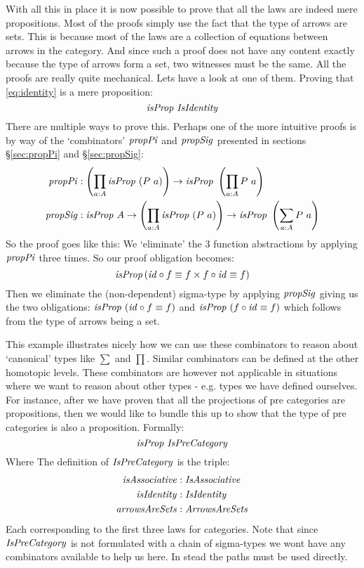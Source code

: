 With all this in place it is now possible to prove that all the laws are indeed
mere propositions. Most of the proofs simply use the fact that the type of
arrows are sets. This is because most of the laws are a collection of equations
between arrows in the category. And since such a proof does not have any content
exactly because the type of arrows form a set, two witnesses must be the same.
All the proofs are really quite mechanical. Lets have a look at one of them.
Proving that \ref{eq:identity} is a mere proposition:
%
\begin{equation}
  \isProp\ \var{IsIdentity}
\end{equation}
%
There are multiple ways to prove this. Perhaps one of the more intuitive proofs
is by way of the `combinators' $\propPi$ and $\propSig$ presented in sections
\S\ref{sec:propPi} and \S\ref{sec:propSig}:
%
\begin{align*}
\propPi & \tp \left(\prod_{a \tp A} \isProp\ (P\ a)\right) \to \isProp\ \left(\prod_{a \tp A} P\ a\right)
  \\
\propSig & \tp \isProp\ A \to \left(\prod_{a \tp A} \isProp\ (P\ a)\right) \to \isProp\ \left(\sum_{a \tp A} P\ a\right)
\end{align*}
%
So the proof goes like this: We `eliminate' the 3 function abstractions by
applying $\propPi$ three times. So our proof obligation becomes:
%
$$
\isProp \left( \id \comp f \equiv f \x f \comp \id \equiv f \right)
$$
%
Then we eliminate the (non-dependent) sigma-type by applying $\propSig$ giving
us the two obligations: $\isProp\ (\id \comp f \equiv f)$ and $\isProp\ (f \comp
\id \equiv f)$ which follows from the type of arrows being a
set.

This example illustrates nicely how we can use these combinators to reason about
`canonical' types like $\sum$ and $\prod$. Similar combinators can be defined at
the other homotopic levels. These combinators are however not applicable in
situations where we want to reason about other types - e.g. types we have
defined ourselves. For instance, after we have proven that all the projections
of pre categories are propositions, then we would like to bundle this up to show
that the type of pre categories is also a proposition. Formally:
%
\begin{equation}
\label{eq:propIsPreCategory}
\isProp\ \IsPreCategory
\end{equation}
%
Where The definition of $\IsPreCategory$ is the triple:
%
\begin{align*}
\var{isAssociative} & \tp \var{IsAssociative}\\
\isIdentity    & \tp \var{IsIdentity}\\
\var{arrowsAreSets} & \tp \var{ArrowsAreSets}
\end{align*}
%
Each corresponding to the first three laws for categories. Note that since
$\IsPreCategory$ is not formulated with a chain of sigma-types we wont have any
combinators available to help us here. In stead the paths must be used directly.

